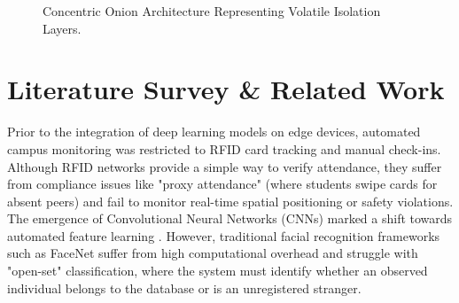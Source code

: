\documentclass[12pt,a4paper,oneside]{report}
\begin{document}
\vspace{0.2in}
\begin{figure}[htbp]
\centering
{}
\caption{Concentric Onion Architecture Representing Volatile Isolation Layers.}
\label{fig:onion_boundary}
\end{figure}

\chapter{Literature Survey \& Related Work}
\thispagestyle{empty}

Prior to the integration of deep learning models on edge devices, automated campus monitoring was restricted to RFID card tracking and manual check-ins. Although RFID networks provide a simple way to verify attendance, they suffer from compliance issues like "proxy attendance" (where students swipe cards for absent peers) and fail to monitor real-time spatial positioning or safety violations. The emergence of Convolutional Neural Networks (CNNs) marked a shift towards automated feature learning \cite{he2016resnet}. However, traditional facial recognition frameworks such as FaceNet \cite{faceNet2015} suffer from high computational overhead \cite{wang2021deepface} and struggle with "open-set" classification, where the system must identify whether an observed individual belongs to the database or is an unregistered stranger.
\end{document}
